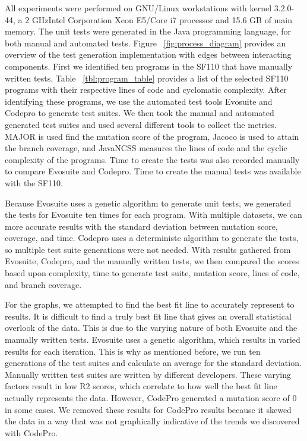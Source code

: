 \documentclass[conference]{IEEEtran}
\begin{document}
All experiments were performed on GNU/Linux workstations with kernel 3.2.0-44, a 2 GHzIntel Corporation Xeon E5/Core i7 processor and  15.6 GB of main memory. The unit tests were generated in the Java programming language, for both manual and automated tests. Figure ~\ref{fig:process_diagram}  provides an overview of the test generation implementation with edges between interacting components. First we identified ten programs in the SF110 that have manually written tests. Table ~\ref{tbl:program_table} provides a list of the selected SF110 programs with their respective lines of code and cyclomatic complexity.  After identifying these programs, we use the automated test tools Evosuite and Codepro to generate test suites. We then took the manual and automated generated test suites and used several different tools to collect the metrics. MAJOR is used find the mutation score of the program, Jacoco is used to attain the branch coverage, and JavaNCSS measures the lines of code and the cyclic complexity of the programs. Time to create the tests was also recorded manually to compare Evosuite and Codepro. Time to create the manual tests was available with the SF110.

Because Evosuite uses a genetic algorithm to generate unit tests, we generated the tests for Evosuite ten times for each program. With multiple datasets, we can more accurate results with the standard deviation between mutation score, coverage, and time. Codepro uses a deterministc algorithm to generate the tests, so multiple test suite generations were not needed. With results gathered from Evosuite, Codepro, and the manually written tests, we then compared the scores based upon complexity, time to generate test suite, mutation score, lines of code, and branch coverage.

For the graphs, we attempted to find the best fit line to accurately represent to results. It is difficult to find a truly best fit line that gives an overall statistical overlook of the data. This is due to the varying nature of both Evosuite and the manually written tests. Evosuite uses a genetic algorithm, which results in varied results for each iteration. This is why as mentioned before, we run ten generations of the test suites and calculate an average for the standard deviation. Manually written test suites are written by different developers. These varying factors result in low  R2 scores, which correlate to how well the best fit line actually represents the data. However, CodePro generated a mutation score of 0 in some cases. We removed these results for CodePro results because it skewed the data in a way that was not graphically indicative of the trends we discovered with CodePro. 
\end{document}
